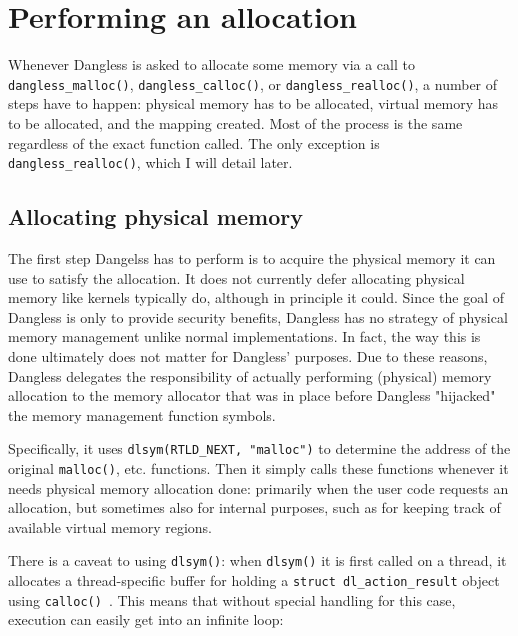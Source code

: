 \section{Performing an allocation}

Whenever Dangless is asked to allocate some memory via a call to \lstinline!dangless_malloc()!, \lstinline!dangless_calloc()!, or \lstinline!dangless_realloc()!, a number of steps have to happen: physical memory has to be allocated, virtual memory has to be allocated, and the mapping created. Most of the process is the same regardless of the exact function called. The only exception is \lstinline!dangless_realloc()!, which I will detail later.

\subsection{Allocating physical memory}

The first step Dangelss has to perform is to acquire the physical memory it can use to satisfy the allocation. It does not currently defer allocating physical memory like kernels typically do, although in principle it could.
Since the goal of Dangless is only to provide security benefits, Dangless has no strategy of physical memory management unlike normal implementations. In fact, the way this is done ultimately does not matter for Dangless' purposes. Due to these reasons, Dangless delegates the responsibility of actually performing (physical) memory allocation to the memory allocator that was in place before Dangless "hijacked" the memory management function symbols.

Specifically, it uses \lstinline!dlsym(RTLD_NEXT, "malloc")! to determine the address of the original \lstinline!malloc()!, etc. functions. Then it simply calls these functions whenever it needs physical memory allocation done: primarily when the user code requests an allocation, but sometimes also for internal purposes, such as for keeping track of available virtual memory regions.

There is a caveat to using \lstinline!dlsym()!: when \lstinline!dlsym()! it is first called on a thread, it allocates a thread-specific buffer for holding a \lstinline!struct dl_action_result! object using \lstinline!calloc()!~\cite{glibc-dlsym-calls-calloc}. This means that without special handling for this case, execution can easily get into an infinite loop:


